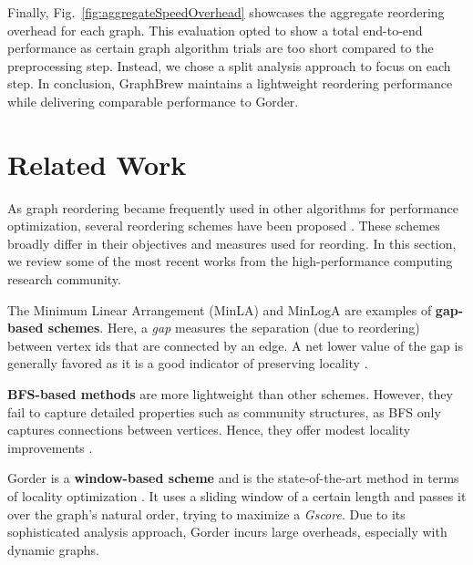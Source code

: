 \documentclass[sigconf, nonacm]{acmart}
\begin{document}
 Finally, Fig.~\ref{fig:aggregateSpeedOverhead} showcases the aggregate reordering overhead for each graph. This evaluation opted to show a total end-to-end performance as certain graph algorithm trials are too short compared to the preprocessing step. Instead, we chose a split analysis approach to focus on each step. In conclusion, GraphBrew maintains a lightweight reordering performance while delivering comparable performance to Gorder.
 

\section{Related Work}
As graph reordering became frequently used in other algorithms for performance optimization, several reordering schemes have been proposed \cite{petit_experiments_2004,boldi_webgraph_2003,barik_vertex_2020,frasca_numa-aware_2012,karypis_fast_1998,karantasis_parallelization_2014,cuthill_reducing_1969,wei_speedup_2016,broder_resemblance_1997, chierichetti_compressing_2009, lasalle_multi-threaded_2013, george_nested_1973,arai_rabbit_2016}. These schemes broadly differ in their objectives and measures used for reording. In this section, we review some of the most recent works from the high-performance computing research community.

The Minimum Linear Arrangement (MinLA) \cite{petit_experiments_2004} and MinLogA \cite{boldi_webgraph_2003} are examples of \textbf{gap-based schemes}. Here, a \emph{gap} measures the separation (due to reordering) between vertex ids that are connected by an edge. A net lower value of the gap is generally favored as it is a good indicator of preserving locality \cite{barik_vertex_2020}.

\textbf{BFS-based methods} \cite{frasca_numa-aware_2012,karypis_fast_1998,karantasis_parallelization_2014,cuthill_reducing_1969} are more lightweight than other schemes. However, they fail to capture detailed properties such as community structures, as BFS only captures connections between vertices. Hence, they offer modest locality improvements \cite{arai_rabbit_2016}.

Gorder \cite{wei_speedup_2016} is a \textbf{window-based scheme} and is the state-of-the-art method in terms of locality optimization \cite{barik_vertex_2020}. It uses a sliding window of a certain length and passes it over the graph's natural order, trying to maximize a \emph{Gscore}. Due to its sophisticated analysis approach, Gorder incurs large overheads, especially with dynamic graphs.
\end{document}
